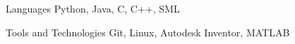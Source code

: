 
\begin{cvskills}
    \cvskill
        {Languages} %
        {Python, Java, C, C++, SML} %

    \cvskill
        {Tools and Technologies}
        {Git, Linux, Autodesk Inventor, MATLAB}
\end{cvskills}

